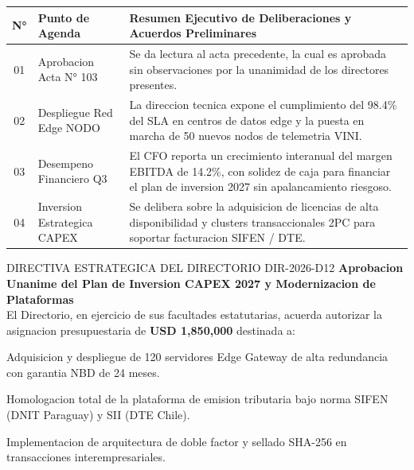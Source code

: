 \documentclass[11pt,a4paper]{article}
\begin{document}
\noindent
\begin{tabularx}{\linewidth}{@{} c p{4.0cm} X @{}}
  \toprule
  \rowcolor{corpDarkHeader}
  {\bfseries\color{white}\scriptsize N°} &
  {\bfseries\color{white}\scriptsize Punto de Agenda} &
  {\bfseries\color{white}\scriptsize Resumen Ejecutivo de Deliberaciones y Acuerdos Preliminares} \\
  \midrule
  \rowcolor{corpLightBg}
  01 & Aprobacion Acta N° 103 & Se da lectura al acta precedente, la cual es aprobada sin observaciones por la unanimidad de los directores presentes. \\
  02 & Despliegue Red Edge NODO & La direccion tecnica expone el cumplimiento del 98.4\% del SLA en centros de datos edge y la puesta en marcha de 50 nuevos nodos de telemetria VINI. \\
  \rowcolor{corpLightBg}
  03 & Desempeno Financiero Q3 & El CFO reporta un crecimiento interanual del margen EBITDA de 14.2\%, con solidez de caja para financiar el plan de inversion 2027 sin apalancamiento riesgoso. \\
  04 & Inversion Estrategica CAPEX & Se delibera sobre la adquisicion de licencias de alta disponibilidad y clusters transaccionales 2PC para soportar facturacion SIFEN / DTE. \\
  \bottomrule
\end{tabularx}

\clearpage

\drawchromaticbar[3.5pt]
\vspace{3mm}

\begin{corpdirective}{DIRECTIVA ESTRATEGICA DEL DIRECTORIO DIR-2026-D12}
  \textbf{Aprobacion Unanime del Plan de Inversion CAPEX 2027 y Modernizacion de Plataformas}\\
  El Directorio, en ejercicio de sus facultades estatutarias, acuerda autorizar la asignacion presupuestaria de \textbf{USD 1,850,000} destinada a:
  \begin{enumerate}[leftmargin=*, noitemsep, topsep=2pt]
    {\small
    \item Adquisicion y despliegue de 120 servidores Edge Gateway de alta redundancia con garantia NBD de 24 meses.
    \item Homologacion total de la plataforma de emision tributaria bajo norma SIFEN (DNIT Paraguay) y SII (DTE Chile).
    \item Implementacion de arquitectura de doble factor y sellado SHA-256 en transacciones interempresariales.}
  \end{enumerate}
\end{corpdirective}
\end{document}
